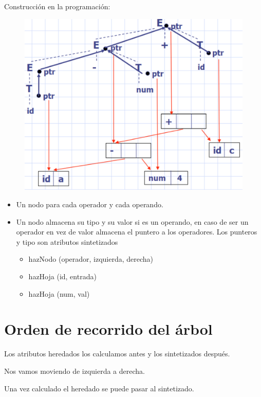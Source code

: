 \documentclass[12pt]{report} %
\begin{document}
Construcción en la programación:
\begin{figure}[H]
  {\includegraphics[scale=.25]{2021-05-01 01_30_29-05_resum_Sem_2021.pdf - Foxit Reader.png}}
\end{figure}
\begin{itemize}
  \item Un nodo para cada operador y cada operando.
  \item Un nodo almacena su tipo y su valor si es un operando, en caso de ser un operador en vez de valor almacena el puntero a los operadores. Los punteros y tipo son atributos sintetizados
  \begin{itemize}
    \item hazNodo (operador, izquierda, derecha)
    \item hazHoja (id, entrada)
    \item hazHoja (num, val)
  \end{itemize}
\end{itemize}

\section{Orden de recorrido del árbol}

Los atributos heredados los calculamos antes y los sintetizados después. 

Nos vamos moviendo de izquierda a derecha.

Una vez calculado el heredado se puede pasar al sintetizado.
\end{document}
